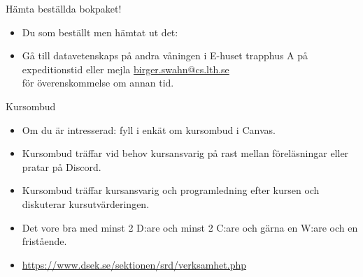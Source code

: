 
\ifkompendium\else
\begin{SlideExtra}{Hämta beställda bokpaket!}
  \begin{itemize}
    \item Du som beställt  men  hämtat ut det: \\
    \item[] Gå till datavetenskaps  på andra våningen i E-huset trapphus A på expeditionstid eller mejla \url{birger.swahn@cs.lth.se} \\ för överenskommelse om annan tid. 
  \end{itemize}
\end{SlideExtra}


  
\begin{SlideExtra}{Kursombud}
\begin{itemize}
\item Om du är intresserad: fyll i enkät om kursombud i Canvas.
\item Kursombud träffar vid behov kursansvarig på rast mellan föreläsningar eller pratar på Discord.
\item Kursombud träffar kursansvarig och programledning efter kursen och diskuterar kursutvärderingen.
\item Det vore bra med minst 2 D:are och minst 2 C:are och gärna en W:are och en fristående.
\item {\SlideFontSmall\url{https://www.dsek.se/sektionen/srd/verksamhet.php}}
\end{itemize}
\end{SlideExtra}
\fi
